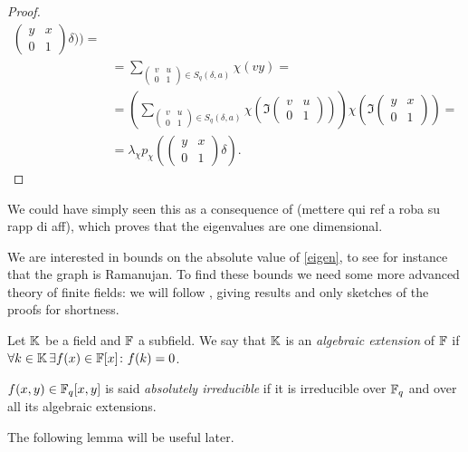 \begin{prop}
\begin{proof}
\begin{align*}
	 \begin{pmatrix} y & x \\ 0 & 1 \end{pmatrix} \delta))=\\
	 &=\sum_{\begin{pmatrix} v & u \\ 0 & 1 \end{pmatrix} \in S_q(\delta,a)}\chi (vy)=\\
	 &=(\sum_{\begin{pmatrix} v & u \\ 0 & 1 \end{pmatrix} \in S_q(\delta,a)}\chi (\Im \begin{pmatrix} v & u \\ 0 & 1 \end{pmatrix}))\chi (\Im  \begin{pmatrix} y & x \\ 0 & 1 \end{pmatrix})=\\
	 &=\lambda_{\chi} p_{\chi} (\begin{pmatrix} y & x \\ 0 & 1 \end{pmatrix} \delta).
\end{align*}
\end{proof}
\end{prop}We could have simply seen this as a consequence of (mettere qui ref a roba su rapp di aff), which proves that the eigenvalues are one dimensional.

We are interested in bounds on the absolute value of \ref{eigen}, to see for instance that the graph is Ramanujan. 
To find these bounds we need some more advanced theory of finite fields: we will follow \cite{schmidt1976equations},
giving results and only sketches of the proofs for shortness.
\begin{defn}
Let ${\mathbb K}$ be a field and ${\mathbb F}$ a subfield. We say that ${\mathbb K}$ is an \emph{algebraic extension} of ${\mathbb F}$ if
$\forall k \in {\mathbb K} \, \exists f(x) \in {\mathbb F}[x] \colon f(k)=0$.
\end{defn}
\begin{defn}
$f(x,y)\in {\mathbb F}_q[x,y]$ is said \emph{absolutely irreducible} if it is irreducible over ${\mathbb F}_q$ and over all its algebraic extensions.
\end{defn}
The following lemma will be useful later.

